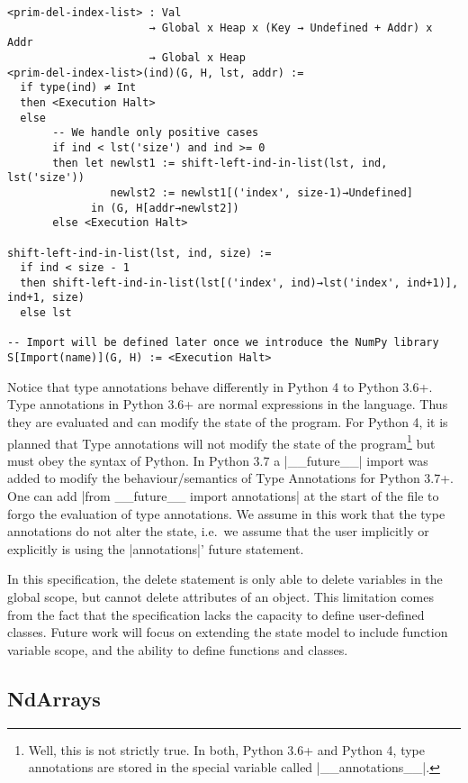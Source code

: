 \begin{verbatim}
<prim-del-index-list> : Val
                      → Global x Heap x (Key → Undefined + Addr) x Addr
                      → Global x Heap
<prim-del-index-list>(ind)(G, H, lst, addr) :=
  if type(ind) ≠ Int
  then <Execution Halt>
  else
       -- We handle only positive cases
       if ind < lst('size') and ind >= 0
       then let newlst1 := shift-left-ind-in-list(lst, ind, lst('size'))
                newlst2 := newlst1[('index', size-1)→Undefined]
             in (G, H[addr→newlst2])
       else <Execution Halt>

shift-left-ind-in-list(lst, ind, size) :=
  if ind < size - 1
  then shift-left-ind-in-list(lst[('index', ind)→lst('index', ind+1)], ind+1, size)
  else lst

-- Import will be defined later once we introduce the NumPy library
S[Import(name)](G, H) := <Execution Halt>
\end{verbatim}

Notice that type annotations behave differently in Python 4 to Python 3.6+. Type
annotations in Python 3.6+ are normal expressions in the language. Thus they are evaluated
and can modify the state of the program. For Python 4, it is planned that Type annotations
will not modify the state of the program\footnote{%
  Well, this is not strictly true. In both, Python 3.6+ and Python 4, type annotations are
  stored in the special variable called \pycode|__annotations__|.
}
but must obey the syntax of Python.
In Python 3.7 a \pycode|__future__| import was added to modify the behaviour/semantics of
Type Annotations for Python 3.7+. One can add \pycode|from __future__ import annotations|
at the start of the file to forgo the evaluation of type annotations. We assume in this
work that the type annotations do not alter the state, i.e.~we assume that the user
implicitly or explicitly is using the \pycode|annotations|' future statement.

In this specification, the delete statement is only able to delete
variables in the global scope, but cannot delete attributes of an
object. This limitation comes from the fact that the specification
lacks the capacity to define user-defined classes. Future work will
focus on extending the state model to include function variable scope,
and the ability to define functions and classes.

\subsection{NdArrays}\label{ndarrays}

